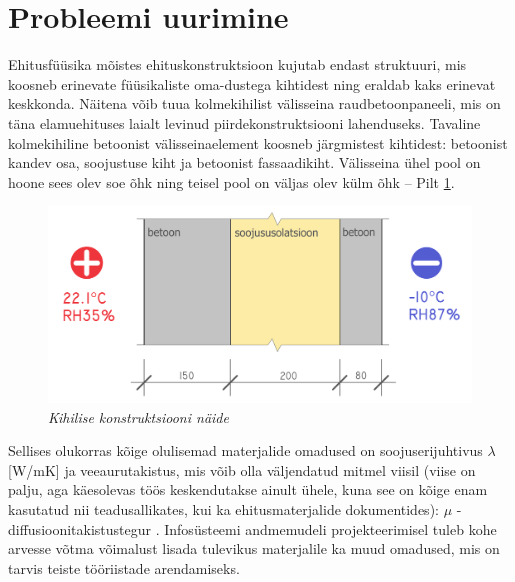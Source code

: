 \section{Probleemi uurimine}
\label{chapters:problem_statement_research}

Ehitusfüüsika mõistes ehituskonstruktsioon kujutab endast struktuuri, mis koosneb erinevate füüsikaliste oma-dustega kihtidest 
ning eraldab kaks erinevat keskkonda. Näitena võib tuua kolmekihilist välisseina raudbetoonpaneeli, mis on täna
elamuehituses laialt levinud piirdekonstruktsiooni lahenduseks\cite{piir_sw_walls}.
Tavaline kolmekihiline betoonist välisseinaelement koosneb järgmistest kihtidest: betoonist kandev osa, soojustuse kiht ja betoonist fassaadikiht. Välisseina ühel pool on 
hoone sees olev soe õhk ning teisel pool on väljas olev külm õhk -- Pilt \ref{fig:construction_sample}. 

\begin{figure}[ht]
    \centering
    \includegraphics[width=.8\textwidth]{figures/problem_statement/07_layered_structure_sample.png}
    \caption[Mitmest kihist koosneva ehituskonstruktsiooni näide]{\textit{Kihilise konstruktsiooni näide}}
    \label{fig:construction_sample}
\end{figure}

Sellises olukorras kõige olulisemad materjalide omadused on soojuserijuhtivus \begin{math}\lambda\end{math} [W/mK]
ja veeaurutakistus, mis võib olla väljendatud mitmel viisil (viise on palju, aga käesolevas töös keskendutakse 
ainult ühele, kuna see on kõige enam kasutatud nii teadusallikates, kui ka ehitusmaterjalide dokumentides):
\begin{math}\mu\end{math} - diffusioonitakistustegur \cite{building_physics_abc}. Infosüsteemi andmemudeli projekteerimisel tuleb kohe arvesse võtma
võimalust lisada tulevikus materjalile ka muud omadused, mis on tarvis teiste tööriistade arendamiseks.

